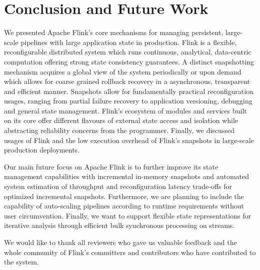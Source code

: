 
\section{Conclusion and Future Work}
\label{sec:conclusion}

We presented Apache Flink's core mechanisms for managing persistent, large-scale pipelines with large application state in production. Flink is a flexible, reconfigurable distributed system which runs continuous, analytical, data-centric computation offering strong state consistency guarantees. A distinct snapshotting mechanism acquires a global view of the system periodically or upon demand which allows for coarse grained rollback recovery in a asynchronous, transparent and efficient manner. Snapshots allow for fundamentally practical reconfiguration usages, ranging from partial failure recovery to application versioning, debugging and general state management. Flink's ecosystem of modules and services built on its core offer different flavours of external state access and isolation while abstracting reliability concerns from the programmer. Finally, we discussed usages of Flink and the low execution overhead of Flink's snapshots in large-scale production deployments.

\vspace{-1mm}
 Our main future focus on Apache Flink is to further improve its state management capabilities with incremental in-memory snapshots and automated system estimation of throughput and reconfiguration latency trade-offs for optimized incremental snapshots. Furthermore, we are planning to include the capability of auto-scaling pipelines according to runtime requirements without user circumvention. Finally, we want to support flexible state representations for iterative analysis through efficient bulk synchronous processing on streams.

\vspace{-1mm}
 We would like to thank all reviewers who gave us valuable feedback and the whole community of Flink's committers and contributors who have contributed to the system. 